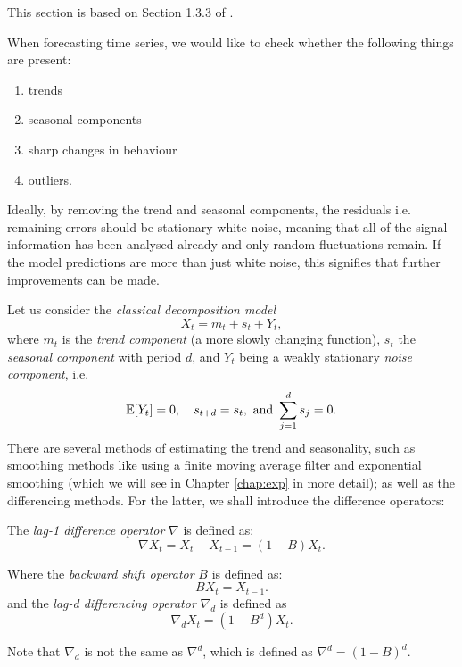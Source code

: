 \documentclass[a4paper, oneside]{discothesis}
\begin{document}
This section is based on Section 1.3.3 of \cite{itsf}.

When forecasting time series, we would like to check whether the following things are present:
\begin{enumerate}[label=(\alph*)]
    \item trends
    \item seasonal components
    \item sharp changes in behaviour
    \item outliers.
\end{enumerate}
Ideally, by removing the trend and seasonal components, the residuals i.e. remaining errors should be stationary white noise, meaning that all of the signal information has been analysed already and only random fluctuations remain. If the model predictions are more than just white noise, this signifies that further improvements can be made.

Let us consider the \textit{classical decomposition model}
\begin{equation} \label{eq:classicaldecomp}
    X_t = m_t + s_t + Y_t,
\end{equation}
where $m_t$ is the \textit{trend component} (a more slowly changing function), $s_t$ the \textit{seasonal component} with period $d$, and $Y_t$ being a weakly stationary \textit{noise component}, i.e.
\begin{equation*}
    \operatorname{\mathbb{E}}[Y_t] = 0,\quad s_{t+d} = s_t,\text{ and }\sum^d_{j=1}s_j = 0.
\end{equation*}
There are several methods of estimating the trend and seasonality, such as smoothing methods like using a finite moving average filter and exponential smoothing (which we will see in Chapter \ref{chap:exp} in more detail); as well as the differencing methods. For the latter, we shall introduce the difference operators:

\begin{definition}
    The \textit{lag-1 difference operator} $\nabla$ is defined as:
    \begin{equation}
        \nabla X_t = X_t - X_{t-1} = (1-B)X_t.
    \end{equation}
    
    Where the \textit{backward shift operator} $B$ is defined as:
    \begin{equation}
        BX_t = X_{t-1}.
    \end{equation}
    and the \textit{lag-d differencing operator} $\nabla_d$ is defined as
    \begin{equation}
        \nabla_d X_t = (1-B^d) X_t.
    \end{equation}
\end{definition}
\begin{remark}
    Note that $\nabla_d$ is not the same as $\nabla^d$, which is defined as $\nabla^d = (1-B)^d$.
\end{remark}
\end{document}
